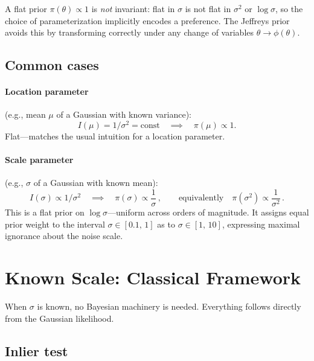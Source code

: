 \documentclass[11pt]{article}
\begin{document}
A flat prior $\pi(\theta) \propto 1$ is \emph{not} invariant: flat in $\sigma$
is not flat in $\sigma^2$ or $\log\sigma$, so the choice of parameterization
implicitly encodes a preference. The Jeffreys prior avoids this by transforming
correctly under any change of variables $\theta \to \phi(\theta)$.

\subsection{Common cases}

\paragraph{Location parameter} (e.g., mean $\mu$ of a Gaussian with known variance):
\begin{equation}
  I(\mu) = 1/\sigma^2 = \text{const}
  \quad\implies\quad
  \pi(\mu) \propto 1.
\end{equation}
Flat---matches the usual intuition for a location parameter.

\paragraph{Scale parameter} (e.g., $\sigma$ of a Gaussian with known mean):
\begin{equation}
  I(\sigma) \propto 1/\sigma^2
  \quad\implies\quad
  \pi(\sigma) \propto \frac{1}{\sigma}\,,
  \qquad\text{equivalently}\quad
  \pi(\sigma^2) \propto \frac{1}{\sigma^2}\,.
\end{equation}
This is a flat prior on $\log\sigma$---uniform across orders of magnitude.
It assigns equal prior weight to the interval $\sigma \in [0.1,\, 1]$ as to
$\sigma \in [1,\, 10]$, expressing maximal ignorance about the noise scale.

\section{Known Scale: Classical Framework}
\label{sec:known}

When $\sigma$ is known, no Bayesian machinery is needed. Everything follows
directly from the Gaussian likelihood.

\subsection{Inlier test}
\label{sec:known-inlier}
\end{document}
